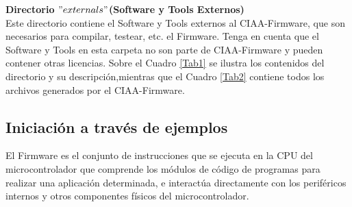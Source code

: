 \documentclass[12pt,letterpaper]{article}
\begin{document}
{\textbf{Directorio $"externals"$(Software y Tools Externos)}\\
Este directorio contiene el Software y Tools externos al CIAA-Firmware, que son necesarios para compilar, testear, etc. el Firmware. Tenga en cuenta que el Software y Tools en esta carpeta no son parte de CIAA-Firmware y pueden contener otras licencias. Sobre el Cuadro \ref{Tab1} se ilustra los contenidos del directorio y su descripción,mientras que el Cuadro \ref{Tab2} contiene todos los archivos generados por el CIAA-Firmware.
\begin{table}[H]
\begin{center}
\caption{Utilidades,archivos,y drivers para la placa}
\label{Tab1}
\end{center}
\end{table}
\begin{table}[H]
\begin{center}
\caption{Descripción de archivos generados en un proyecto en RTOS.}
\label{Tab2}
\end{center}
\end{table}
}

\subsection{Iniciación a través de ejemplos}
El Firmware es el conjunto de instrucciones que se ejecuta en la CPU del microcontrolador que comprende los módulos de código de programas para realizar una aplicación determinada, e interactúa directamente con los periféricos internos y otros componentes físicos del microcontrolador.
  \\
  
\end{document}
